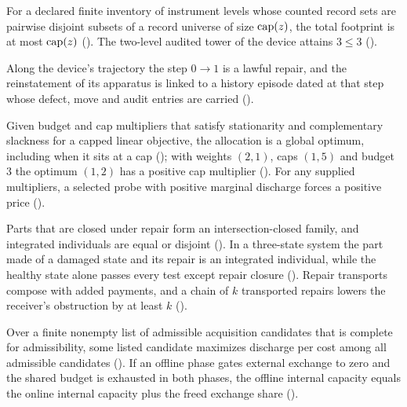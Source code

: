 \begin{headline}
For a declared finite inventory of instrument levels whose counted record sets are pairwise disjoint
subsets of a record universe of size $\operatorname{cap}(z)$, the total footprint is at most $\operatorname{cap}(z)$
(). The two-level audited tower of the device attains $3 \le 3$
().
\end{headline}

\begin{headline}
Along the device's trajectory the step $0 \to 1$ is a lawful repair, and the reinstatement of its
apparatus is linked to a history episode dated at that step whose defect, move and audit entries are
carried ().
\end{headline}

\begin{headline}
Given budget and cap multipliers that satisfy stationarity and complementary slackness for a capped
linear objective, the allocation is a global optimum, including when it sits at a cap
(); with weights $(2, 1)$, caps $(1, 5)$ and budget $3$ the optimum $(1, 2)$ has a
positive cap multiplier (). For any supplied multipliers, a selected probe with
positive marginal discharge forces a positive price ().
\end{headline}

\begin{headline}
Parts that are closed under repair form an intersection-closed family, and integrated individuals
are equal or disjoint (). In a three-state system the part made of a
damaged state and its repair is an integrated individual, while the healthy state alone passes every
test except repair closure (). Repair transports compose with added payments,
and a chain of $k$ transported repairs lowers the receiver's obstruction by at least $k$
().
\end{headline}

\begin{headline}
Over a finite nonempty list of admissible acquisition candidates that is complete for admissibility,
some listed candidate maximizes discharge per cost among all admissible candidates
(). If an offline phase gates external exchange to zero and the shared budget is
exhausted in both phases, the offline internal capacity equals the online internal capacity plus
the freed exchange share ().
\end{headline}

